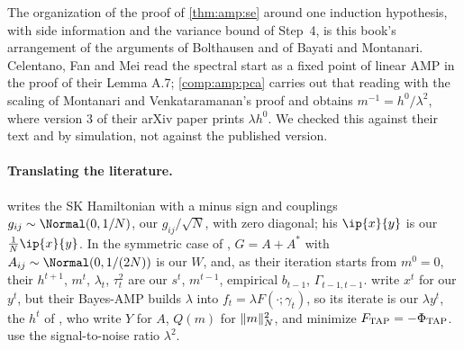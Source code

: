 \begin{refsection}
The organization of the proof of \cref{thm:amp:se} around one induction hypothesis, with side information and the variance bound of Step~4, is this book's arrangement of the arguments of Bolthausen and of Bayati and Montanari. Celentano, Fan and Mei read the spectral start as a fixed point of linear AMP in the proof of their Lemma A.7; \cref{comp:amp:pca} carries out that reading with the scaling of Montanari and Venkataramanan's proof and obtains $m^{-1}=h^0/\lambda^2$, where version 3 of their arXiv paper prints $\lambda h^0$. We checked this against their text and by simulation, not against the published version.

\paragraph{Translating the literature.} \Textcite{Bolthausen2014} writes the SK Hamiltonian with a minus sign and couplings $g_{ij}\sim\Normal(0,1/N)$, our $g_{ij}/\sqrt N$, with zero diagonal; his $\ip{x}{y}$ is our $\frac1N\ip{x}{y}$. In the symmetric case of \textcite{BayatiMontanari2011}, $G=A+A^*$ with $A_{ij}\sim\Normal(0,1/(2N))$ is our $W$, and, as their iteration starts from $m^0=0$, their $h^{t+1}$, $m^t$, $\lambda_t$, $\tau_t^2$ are our $s^t$, $m^{t-1}$, empirical $b_{t-1}$, $\Gamma_{t-1,t-1}$. \Textcite{MontanariVenkataramanan2021} write $x^t$ for our $y^t$, but their Bayes-AMP builds $\lambda$ into $f_t=\lambda F(\cdot;\gamma_t)$, so its iterate is our $\lambda y^t$, the $h^t$ of \textcite{CelentanoFanMei2023}, who write $Y$ for $A$, $Q(m)$ for $\lVert m\rVert_N^2$, and minimize $F_{\mathrm{TAP}}=-\Phi_{\mathrm{TAP}}$. \Textcite{LelargeMiolane2019} use the signal-to-noise ratio $\lambda^2$.

\printchapterbib
\end{refsection}
